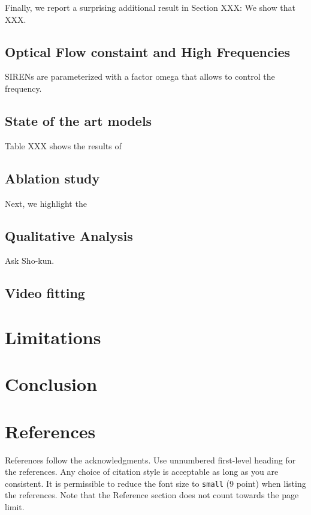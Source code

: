 \documentclass{article}
\begin{document}
Finally, we report a surprising additional result in Section XXX:
We show that XXX.



\subsection{Optical Flow constaint and High Frequencies}

SIRENs are parameterized with a factor omega that allows to control the frequency.


\subsection{State of the art models}

Table XXX shows the results of

\subsection{Ablation study}

Next, we highlight the 

\subsection{Qualitative Analysis}

% 
Ask Sho-kun.

\subsection{Video fitting}



\section{Limitations}







\section{Conclusion}



\section*{References}
References follow the acknowledgments. Use unnumbered first-level heading for
the references. Any choice of citation style is acceptable as long as you are
consistent. It is permissible to reduce the font size to \verb+small+ (9 point)
when listing the references.
Note that the Reference section does not count towards the page limit.
\medskip
\end{document}
